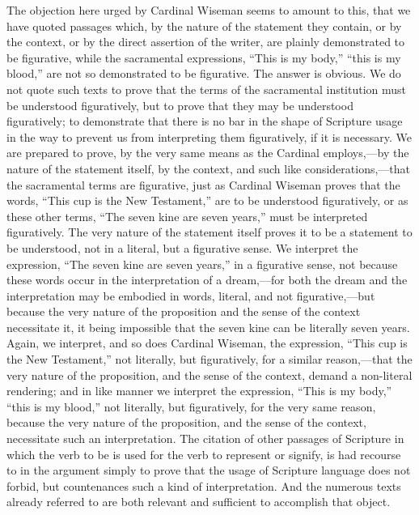 \documentclass[]{book}
\begin{document}
The objection here urged by Cardinal Wiseman seems to amount to this, that we have quoted passages which, by the nature of the statement they contain, or by the context, or by the direct assertion of the writer, are plainly demonstrated to be figurative, while the sacramental expressions, ``This is my body,'' ``this is my blood,'' are not so demonstrated to be figurative. The answer is obvious. We do not quote such texts to prove that the terms of the sacramental institution must be understood figuratively, but to prove that they may be understood figuratively; to demonstrate that there is no bar in the shape of Scripture usage in the way to prevent us from interpreting them figuratively, if it is necessary. We are prepared to prove, by the very same means as the Cardinal employs,---by the nature of the statement itself, by the context, and such like considerations,---that the sacramental terms are figurative, just as Cardinal Wiseman proves that the words, ``This cup is the New Testament,'' are to be understood figuratively, or as these other terms, ``The seven kine are seven years,'' must be interpreted figuratively. The very nature of the statement itself proves it to be a statement to be understood, not in a literal, but a figurative sense. We interpret the expression, ``The seven kine are seven years,'' in a figurative sense, not because these words occur in the interpretation of a dream,---for both the dream and the interpretation may be embodied in words, literal, and not figurative,---but because the very nature of the proposition and the sense of the context necessitate it, it being impossible that the seven kine can be literally seven years. Again, we interpret, and so does Cardinal Wiseman, the expression, ``This cup is the New Testament,'' not literally, but figuratively, for a similar reason,---that the very nature of the proposition, and the sense of the context, demand a non-literal rendering; and in like manner we interpret the expression, ``This is my body,'' ``this is my blood,'' not literally, but figuratively, for the very same reason, because the very nature of the proposition, and the sense of the context, necessitate such an interpretation. The citation of other passages of Scripture in which the verb to be is used for the verb to represent or signify, is had recourse to in the argument simply to prove that the usage of Scripture language does not forbid, but countenances such a kind of interpretation. And the numerous texts already referred to are both relevant and sufficient to accomplish that object.
\end{document}
